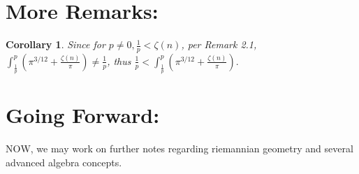 \documentclass[10pt]{article}
\theoremstyle{plain}
\newtheorem{corollary}[theorem]{Corollary}
\theoremstyle{definition}
\theoremstyle{remark}
\begin{document}
\section{More Remarks:}

\begin{corollary}
	Since for $p \neq 0, \frac{1}{p} < \zeta(n)$, per Remark 2.1, $\int_{\frac{1}{p}}^{p} (\pi^{3/12} + \frac{\zeta(n)}{\pi}) \neq \frac{1}{p}$, thus $\frac{1}{p} < \int_{\frac{1}{p}}^{p} (\pi^{3/12} + \frac{\zeta(n)}{\pi}).$
\end{corollary}

\section{Going Forward:}

\lettrine[lines=1, lhang=0.1, loversize=0.2]{N}OW, we may work on further notes regarding riemannian geometry and several advanced algebra concepts.

\nocite{*}




\end{document}
